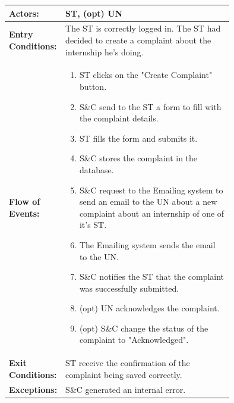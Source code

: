 \begin{center}
    \begin{longtable}{|l|p{0.75\linewidth}|}
        \hline
        \textbf{Actors:}           & ST, (opt) UN                                                                                                                \\
        \hline
        \textbf{Entry Conditions:} & The ST is correctly logged in. The ST had decided to create a complaint about the internship he's doing.                                                   \\
        \hline
        \textbf{Flow of Events:}   & \begin{enumerate}
                \item ST clicks on the "Create Complaint" button.
                \item S\&C send to the ST a form to fill with the complaint details.
                \item ST fills the form and submits it.
                \item S\&C stores the complaint in the database.
                \item S\&C request to the Emailing system to send an email to the UN about a new complaint about an internship of one of it's ST.
                \item The Emailing system sends the email to the UN.
                \item S\&C notifies the ST that the complaint was successfully submitted.
                \item (opt) UN acknowledges the complaint.
                \item (opt) S\&C change the status of the complaint to "Acknowledged".
            \end{enumerate} \\
        \hline
        \textbf{Exit Conditions:}  &  ST receive the confirmation of the complaint being saved correctly.                                               \\
        \hline
        \textbf{Exceptions:}       & S\&C generated an internal error.                                                                                     \\
        \hline
    \end{longtable}
\end{center}

